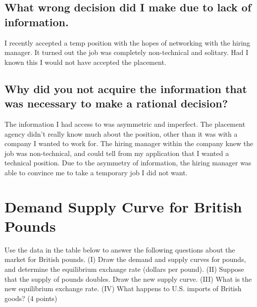\documentclass[a4paper]{article}
\begin{document}
\subsection{What wrong decision did I make due to lack of information.}

I recently accepted a temp position with the hopes of networking with the hiring manager. It turned out the job was completely non-technical and solitary.
Had I known this I would not have accepted the placement.


\subsection{Why did you not acquire the information that was necessary to make a rational decision?}

The information I had access to was asymmetric and imperfect. The placement agency didn't really know much about the position, other than it was with a company I wanted to work for.
The hiring manager within the company knew the job was non-technical, and could tell from my application that I wanted a technical position. Due to the asymmetry of information, the
hiring manager was able to convince me to take a temporary job I did not want. 
\newpage

\section{Demand Supply Curve for British Pounds}

Use the data in the table below to answer the following questions about the market for British pounds. (I) Draw the demand and supply curves for pounds, 
and determine the equilibrium exchange rate (dollars per pound). (II) Suppose that the supply of pounds doubles. Draw the new supply curve. 
(III) What is the new equilibrium exchange rate. (IV) What happens to U.S. imports of British goods? (4 points)
\end{document}
